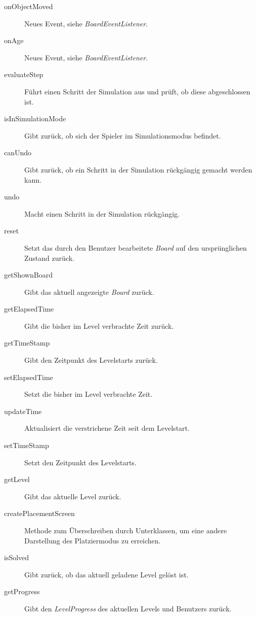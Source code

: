 \begin{description}
\item[onObjectMoved]
Neues Event, siehe \emph{BoardEventListener}.

\item[onAge]
Neues Event, siehe \emph{BoardEventListener}.

\item[evaluateStep]
Führt einen Schritt der Simulation aus und prüft, ob diese abgeschlossen ist.

\item[isInSimulationMode]
Gibt zurück, ob sich der Spieler im Simulationsmodus befindet.

\item[canUndo]
Gibt zurück, ob ein Schritt in der Simulation rückgängig gemacht werden kann.

\item[undo]
Macht einen Schritt in der Simulation rückgängig.

\item[reset]
Setzt das durch den Benutzer bearbeitete \emph{Board} auf den ursprünglichen Zustand zurück.

\item[getShownBoard]
Gibt das aktuell angezeigte \emph{Board} zurück.

\item[getElapsedTime]
Gibt die bisher im Level verbrachte Zeit zurück.

\item[getTimeStamp]
Gibt den Zeitpunkt des Levelstarts zurück.

\item[setElapsedTime]
Setzt die bisher im Level verbrachte Zeit.

\item[updateTime]
Aktualisiert die verstrichene Zeit seit dem Levelstart.

\item[setTimeStamp]
Setzt den Zeitpunkt des Levelstarts.

\item[getLevel]
Gibt das aktuelle Level zurück.

\item[createPlacementScreen]
Methode zum Überschreiben durch Unterklassen, um eine andere Darstellung des Platziermodus zu erreichen.

\item[isSolved]
Gibt zurück, ob das aktuell geladene Level gelöst ist.

\item[getProgress]
Gibt den \emph{LevelProgress} des aktuellen Levels und Benutzers zurück.


\end{description}
